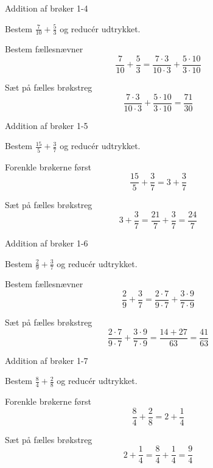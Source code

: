 \documentclass{article}
\begin{document}
\newpage

\begin{exercise}{Addition af brøker 1-4}

Bestem $\frac{7}{10} + \frac{5}{3}$ og reducér udtrykket.


\hint

Bestem fællesnævner
\[
\frac{7}{10} + \frac{5}{3} = \frac{7 \cdot 3}{10 \cdot 3} + \frac{5 \cdot 10}{3\cdot 10}
\]

\hint

Sæt på fælles brøkstreg
\[
\frac{7 \cdot 3}{10 \cdot 3} + \frac{5 \cdot 10}{3\cdot 10} = \frac{71}{30}
\]

\end{exercise}

\newpage

\begin{exercise}{Addition af brøker 1-5}

Bestem $\frac{15}{5} + \frac{3}{7}$ og reducér udtrykket.


\hint

Forenkle brøkerne først
\[
\frac{15}{5} + \frac{3}{7} = 3 + \frac{3}{7}
\]

\hint

Sæt på fælles brøkstreg
\[
3 + \frac{3}{7} = \frac{21}{7} + \frac{3}{7} = \frac{24}{7}
\]

\end{exercise}
\newpage

\begin{exercise}{Addition af brøker 1-6}

Bestem $\frac{2}{9} + \frac{3}{7}$ og reducér udtrykket.


\hint

Bestem fællesnævner
\[
\frac{2}{9} + \frac{3}{7} = \frac{2 \cdot 7}{9 \cdot 7} + \frac{3 \cdot 9}{7\cdot 9}
\]

\hint

Sæt på fælles brøkstreg
\[
\frac{2 \cdot 7}{9 \cdot 7} + \frac{3 \cdot 9}{7\cdot 9} = \frac{14 + 27}{63} = \frac{41}{63}
\]

\end{exercise}
\newpage

\begin{exercise}{Addition af brøker 1-7}

Bestem $\frac{8}{4} + \frac{2}{8}$ og reducér udtrykket.


\hint

Forenkle brøkerne først
\[
\frac{8}{4} + \frac{2}{8} = 2 + \frac{1}{4}
\]

\hint

Sæt på fælles brøkstreg
\[
2 + \frac{1}{4} = \frac{8}{4} + \frac{1}{4} = \frac{9}{4}
\]

\end{exercise}
\end{document}
